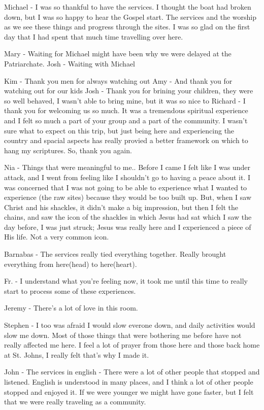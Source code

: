\documentclass[letterpaper]{report}
\begin{document}
Michael - I was so thankful to have the services. I thought the boat had broken down, but I was so happy to hear the Gospel start. The services and the worship as we see these things and progress through the sites. I was so glad on the first day that I had spent that much time travelling over here.

Mary - Waiting for Michael might have been why we were delayed at the Patriarchate. 
Josh - Waiting with Michael 

Kim - Thank you men for always watching out
Amy - And thank you for watching out for our kids
Josh - Thank you for brining your children, they were so well behaved, I wasn't able to bring mine, but it was so nice to 
Richard - I thank you for welcoming us so much. It was a tremendous spiritual experience and I felt so much a part of your group and a part of the community.
I wasn't sure what to expect on this trip, but just being here and experiencing the country and spacial aspects has really provied a better framework on which to hang my scriptures.  So, thank you again.

Nia - Things that were meaningful to me.. Before I came I felt like I was under attack, and I went from feeling like I shouldn't go to having a peace about it.
I was concerned that I was not going to be able to experience what I wanted to experience (the raw sites) because they would be too built up.
But, when I saw Christ and his shackles, it didn't make a big impression, but then I felt the chains, and saw the icon of the shackles in which Jesus had sat which I saw the day before, I was just struck; Jesus was really here and I experienced a piece of His life.
  Not a very common icon.

Barnabas - The services really tied everything together.
  Really brought everything from here(head) to here(heart).

Fr. - I understand what you're feeling now, it took me until this time to really start to process some of these experiences.

Jeremy - There's a lot of love in this room.

Stephen - I too was afraid I would slow everone down, and daily activities would slow me down. Most of those things that were bothering me before have not really affected me here. I feel a lot of prayer from those here and those back home at St. Johns, I really felt that's why I made it.

John - The services in english - There were a lot of other people that stopped and listened. English is understood in many places, and I think a lot of other people stopped and enjoyed it.  If we were younger we might have gone faster, but I felt that we were really traveling as a community.
\end{document}
